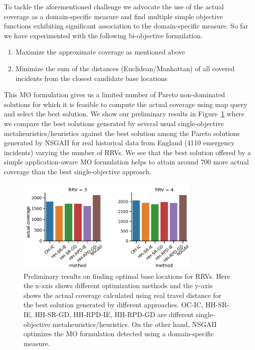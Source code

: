 To tackle the aforementioned challenge we advocate the use of the actual coverage as a domain-specific measure and find multiple simple objective functions exhibiting significant association to the domain-specific measure. So far we have experimented with the following bi-objective formulation.

\begin{enumerate}[label=$F_\arabic*$)]
	\item Maximize the approximate coverage as mentioned above
	\item Minimize the sum of the distances (Euclidean/Manhattan) of all covered incidents from the closest candidate base locations
\end{enumerate}

This MO formulation gives us a limited number of Pareto non-dominated solutions for which it is feasible to compute the actual coverage using map query and select the best solution. We show our preliminary results in Figure~\ref{fig:rrv-results} where we compare the best solutions generated by several usual single-objective metaheuristics/heuristics against the best solution among the Pareto solutions generated by NSGAII for real historical data from England (4110 emergency incidents) varying the number of RRVs. We see that the best solution offered by a simple application-aware MO formulation helps to attain around 700 more actual coverage than the best single-objective approach.

\begin{figure}[!htbp]
	\centering	
	\includegraphics[width=0.8\textwidth]{Figure/rrv-results}
	\caption[Preliminary results on finding optimal base locations for RRVs]{Preliminary results on finding optimal base locations for RRVs. Here the x-axis shows different optimization methods and the y-axis shows the actual coverage calculated using real travel distance for the best solution generated by different approaches. OC-IC, HH-SR-IE, HH-SR-GD, HH-RPD-IE, HH-RPD-GD are different single-objective metaheuristics/heuristics. On the other hand, NSGAII optimizes the MO formulation detected using a domain-specific measure.}
	
	\label{fig:rrv-results}
	
\end{figure}

